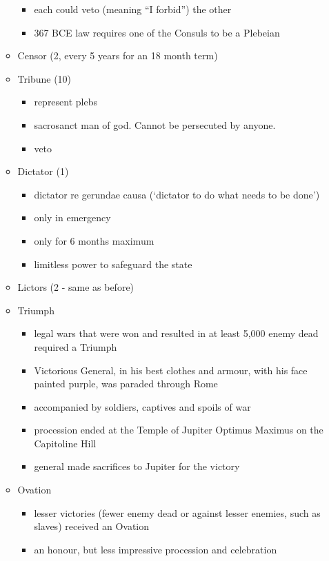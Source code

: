 \documentclass[12pt, twoside]{article}
\begin{document}
\begin{itemize}
\begin{itemize}
\begin{itemize}
		\item each could veto (meaning “I forbid”) the other
		\item 367 BCE law requires one of the Consuls to be a Plebeian
		\end{itemize}
	\item Censor (2, every 5 years for an 18 month term)
	\item Tribune (10)
		\begin{itemize}
		\item represent plebs
		\item sacrosanct man of god.  Cannot be persecuted by anyone.
		\item veto
		\end{itemize}
	\item Dictator (1)
		\begin{itemize}
		\item dictator re gerundae causa (‘dictator to do what needs to be done’)
		\item only in emergency
		\item only for 6 months maximum
		\item limitless power to safeguard the state 
		\end{itemize}
	\item Lictors (2 - same as before)
	\item Triumph
		\begin{itemize}
		\item legal wars that were won and resulted in at least 5,000 enemy dead required a Triumph
		\item Victorious General, in his best clothes and armour, with his face painted purple, was paraded through Rome
		\item accompanied by soldiers, captives and spoils of war
		\item procession ended at the Temple of Jupiter Optimus Maximus on the Capitoline Hill
		\item general made sacrifices to Jupiter for the victory
		\end{itemize}
	\item Ovation
		\begin{itemize}
		\item lesser victories (fewer enemy dead or against lesser enemies, such as slaves) received an Ovation
		\item an honour, but less impressive procession and celebration
		\end{itemize}
	\end{itemize}	
\end{itemize}
\end{document}
